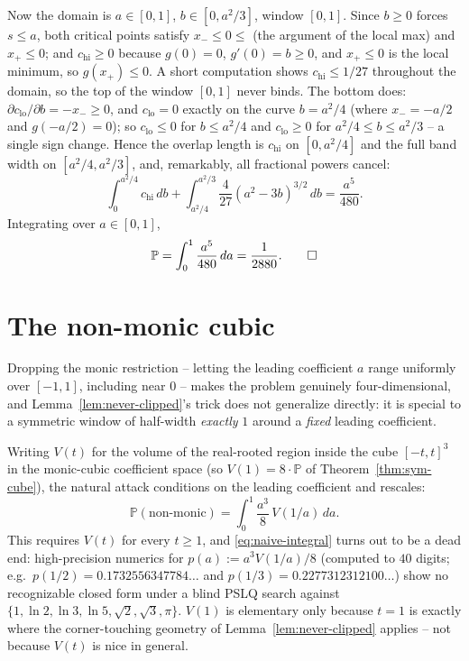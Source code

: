 \documentclass[11pt,reqno]{amsart}
\theoremstyle{plain}
\theoremstyle{remark}
\newcommand{\Prb}{\mathbb{P}}
\begin{document}
Now the domain is $a\in[0,1]$, $b\in[0,a^2/3]$, window $[0,1]$.
Since $b\ge0$ forces $s\le a$, both critical points satisfy $x_-\le0\le$
(the argument of the local max) and $x_+\le0$; and $c_{\mathrm{hi}}\ge0$
because $g(0)=0$, $g'(0)=b\ge0$, and $x_+\le0$ is the local minimum, so
$g(x_+)\le0$. A short computation shows $c_{\mathrm{hi}}\le1/27$ throughout the
domain, so the top of the window $[0,1]$ never binds. The bottom does:
$\partial c_{\mathrm{lo}}/\partial b=-x_-\ge0$, and $c_{\mathrm{lo}}=0$ exactly
on the curve $b=a^2/4$ (where $x_-=-a/2$ and $g(-a/2)=0$); so
$c_{\mathrm{lo}}\le0$ for $b\le a^2/4$ and $c_{\mathrm{lo}}\ge0$ for
$a^2/4\le b\le a^2/3$ -- a single sign change. Hence the overlap length is
$c_{\mathrm{hi}}$ on $[0,a^2/4]$ and the full band width on
$[a^2/4,a^2/3]$, and, remarkably, all fractional powers cancel:
\[
  \int_0^{a^2/4}c_{\mathrm{hi}}\,db+\int_{a^2/4}^{a^2/3}\frac{4}{27}(a^2-3b)^{3/2}\,db = \frac{a^5}{480}.
\]
Integrating over $a\in[0,1]$,
\[
  \Prb = \int_0^1\frac{a^5}{480}\,da = \frac{1}{2880}. \qedhere
\]

\section{The non-monic cubic} \label{sec:nonmonic}

Dropping the monic restriction -- letting the leading coefficient $a$ range
uniformly over $[-1,1]$, including near $0$ -- makes the problem genuinely
four-dimensional, and Lemma~\ref{lem:never-clipped}'s trick does not
generalize directly: it is special to a symmetric window of half-width
\emph{exactly} $1$ around a \emph{fixed} leading coefficient.

Writing $V(t)$ for the volume of the real-rooted region inside the cube
$[-t,t]^3$ in the monic-cubic coefficient space (so $V(1)=8\cdot\Prb$ of
Theorem~\ref{thm:sym-cube}), the natural attack conditions on the leading
coefficient and rescales:
\begin{equation} \label{eq:naive-integral}
  \Prb(\text{non-monic}) = \int_0^1 \frac{a^3}{8}\,V(1/a)\,da.
\end{equation}
This requires $V(t)$ for every $t\ge1$, and \eqref{eq:naive-integral} turns
out to be a dead end: high-precision numerics for $p(a):=a^3V(1/a)/8$
(computed to $40$ digits; e.g.\ $p(1/2)=0.1732556347784\ldots$ and
$p(1/3)=0.2277312312100\ldots$) show no recognizable closed form under a
blind PSLQ search against $\{1,\ln2,\ln3,\ln5,\sqrt2,\sqrt3,\pi\}$. $V(1)$ is
elementary only because $t=1$ is exactly where the corner-touching geometry of
Lemma~\ref{lem:never-clipped} applies -- not because $V(t)$ is nice in
general.
\end{document}
